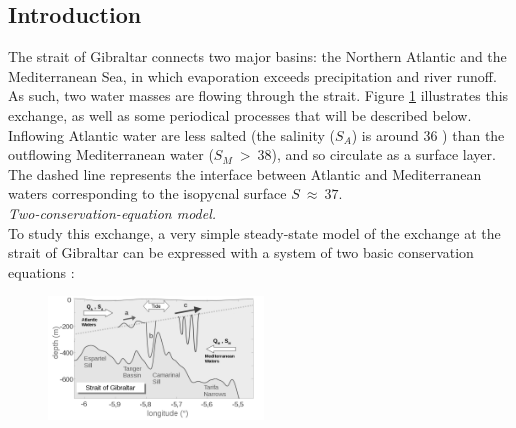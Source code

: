\hypersetup{pdfborder=0 0 0}

\subsection{Introduction}

The strait of Gibraltar connects two major basins: the Northern Atlantic and the Mediterranean Sea, in which evaporation exceeds precipitation and river runoff. As such, two water masses are flowing through the strait. Figure \ref{scheme_GBR} illustrates this exchange, as well as some periodical processes that will be described below. Inflowing Atlantic water are less salted (the salinity ($S_A$) is around 36 ) than the outflowing Mediterranean water ($S_M\ >\ 38$), and so circulate as a surface layer. The dashed line represents the interface between Atlantic and Mediterranean waters corresponding to the isopycnal surface $S\ \approx\ 37$.\\

\textit{Two-conservation-equation model.}\\
To study this exchange, a very simple steady-state model of the exchange at the strait of Gibraltar can be expressed with a system of two basic conservation equations :\\
\begin{figure} 
 \centering
 \includegraphics[width=0.51\textwidth]{./papier2D/schema_echange.png}
\label{scheme_GBR}
\end{figure}

